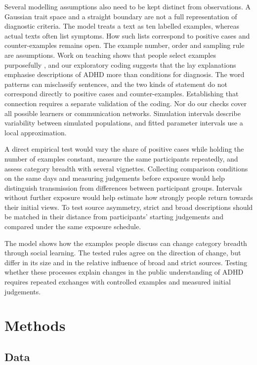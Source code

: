 \documentclass[11pt]{article}
\begin{document}
Several modelling assumptions also need to be kept distinct from observations. A Gaussian trait space and a straight boundary are not a full representation of diagnostic criteria. The model treats a text as ten labelled examples, whereas actual texts often list symptoms. How such lists correspond to positive cases and counter-examples remains open. The example number, order and sampling rule are assumptions. Work on teaching shows that people select examples purposefully \citep{avrahami1997,shafto2014}, and our exploratory coding suggests that the lay explanations emphasise descriptions of ADHD more than conditions for diagnosis. The word patterns can misclassify sentences, and the two kinds of statement do not correspond directly to positive cases and counter-examples. Establishing that connection requires a separate validation of the coding. Nor do our checks cover all possible learners or communication networks. Simulation intervals describe variability between simulated populations, and fitted parameter intervals use a local approximation.

A direct empirical test would vary the share of positive cases while holding the number of examples constant, measure the same participants repeatedly, and assess category breadth with several vignettes. Collecting comparison conditions on the same days and measuring judgements before exposure would help distinguish transmission from differences between participant groups. Intervals without further exposure would help estimate how strongly people return towards their initial views. To test source asymmetry, strict and broad descriptions should be matched in their distance from participants' starting judgements and compared under the same exposure schedule.

The model shows how the examples people discuss can change category breadth through social learning. The tested rules agree on the direction of change, but differ in its size and in the relative influence of broad and strict sources. Testing whether these processes explain changes in the public understanding of ADHD requires repeated exchanges with controlled examples and measured initial judgements.

\section{Methods}

\subsection{Data}
\end{document}
